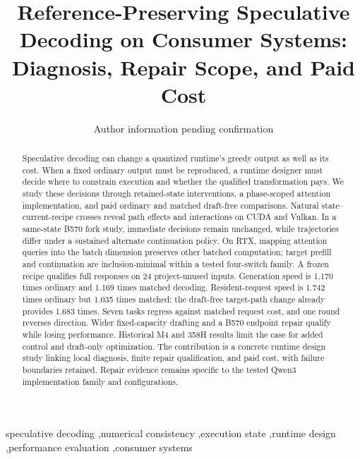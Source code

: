 \documentclass[final,5p,times,twocolumn]{elsarticle}
\begin{document}
\begin{frontmatter}
\title{Reference-Preserving Speculative Decoding on Consumer Systems: Diagnosis, Repair Scope, and Paid Cost}
\author{Author information pending confirmation}
\begin{abstract}
Speculative decoding can change a quantized runtime's greedy output as well as its cost. When a fixed ordinary output must be reproduced, a runtime designer must decide where to constrain execution and whether the qualified transformation pays. We study these decisions through retained-state interventions, a phase-scoped attention implementation, and paid ordinary and matched draft-free comparisons. Natural state--current-recipe crosses reveal path effects and interactions on CUDA and Vulkan. In a same-state B570 fork study, immediate decisions remain unchanged, while trajectories differ under a sustained alternate continuation policy. On RTX, mapping attention queries into the batch dimension preserves other batched computation; target prefill and continuation are inclusion-minimal within a tested four-switch family. A frozen recipe qualifies full responses on 24 project-unused inputs. Generation speed is 1.170 times ordinary and 1.169 times matched decoding. Resident-request speed is 1.742 times ordinary but 1.035 times matched: the draft-free target-path change already provides 1.683 times. Seven tasks regress against matched request cost, and one round reverses direction. Wider fixed-capacity drafting and a B570 endpoint repair qualify while losing performance. Historical M4 and 358H results limit the case for added control and draft-only optimization. The contribution is a concrete runtime design study linking local diagnosis, finite repair qualification, and paid cost, with failure boundaries retained. Repair evidence remains specific to the tested Qwen3 implementation family and configurations.
\end{abstract}
\begin{keyword}
speculative decoding \sep numerical consistency \sep execution state \sep runtime design \sep performance evaluation \sep consumer systems
\end{keyword}
\end{frontmatter}











\end{document}
